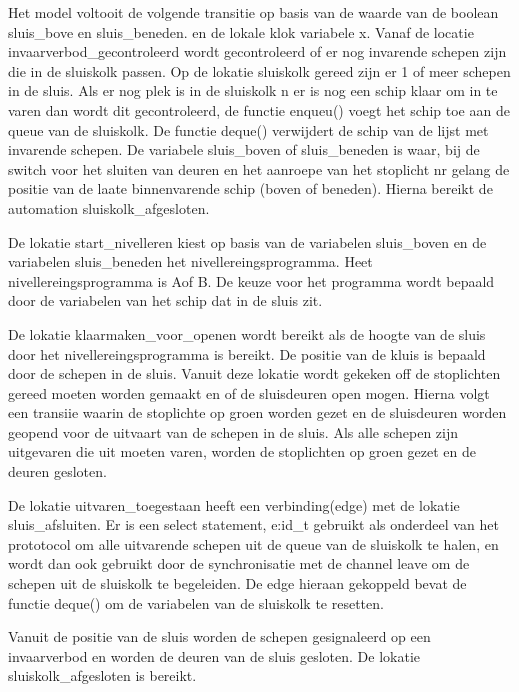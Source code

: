 Het model voltooit de volgende transitie op basis van de waarde van de boolean sluis_bove en sluis_beneden. en de lokale klok variabele x.
Vanaf de locatie invaarverbod_gecontroleerd  wordt gecontroleerd of er nog invarende schepen zijn die in de sluiskolk passen.
Op de lokatie sluiskolk gereed zijn er 1 of meer schepen in de sluis. Als er nog plek is in de sluiskolk n er is nog een schip klaar om in te varen dan wordt dit gecontroleerd, de functie enqueu() voegt het schip toe aan de queue van de sluiskolk. De functie deque() verwijdert de schip van de lijst met invarende schepen. De variabele sluis_boven of sluis_beneden is waar, bij de switch voor het sluiten van deuren en het aanroepe van het stoplicht nr gelang de positie van  de laate binnenvarende schip (boven of beneden). Hierna bereikt de automation sluiskolk_afgesloten.



De lokatie start_nivelleren kiest op basis van de variabelen sluis_boven en de variabelen sluis_beneden het nivellereingsprogramma.
Heet nivellereingsprogramma is Aof B. De keuze voor het programma wordt bepaald door de variabelen van het schip dat in de sluis zit.

De lokatie klaarmaken_voor_openen wordt bereikt als de   hoogte van de sluis  door het nivellereingsprogramma is bereikt.
De positie van de kluis is bepaald door de schepen in de sluis. Vanuit deze lokatie wordt gekeken off de stoplichten gereed moeten worden gemaakt en of de sluisdeuren open mogen.
Hierna volgt een transiie waarin de stoplichte op groen worden gezet en de sluisdeuren worden geopend voor de uitvaart van de schepen in de sluis.
Als alle schepen zijn uitgevaren die uit moeten varen, worden de stoplichten op groen gezet en de deuren gesloten.


De lokatie uitvaren_toegestaan heeft een verbinding(edge) met de lokatie sluis_afsluiten.
Er is een select statement, e:id_t gebruikt als onderdeel van het prototocol om alle uitvarende schepen uit de queue van de sluiskolk te halen, en wordt dan ook gebruikt door de synchronisatie met de channel leave om de schepen uit de sluiskolk te begeleiden. De edge hieraan gekoppeld bevat de functie deque() om de variabelen  van de sluiskolk te resetten.

Vanuit de positie van de sluis worden de schepen gesignaleerd op een invaarverbod en worden de deuren van de sluis gesloten.
De lokatie sluiskolk_afgesloten is bereikt.

